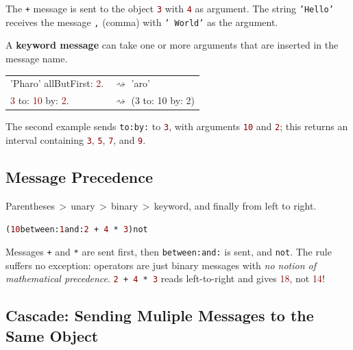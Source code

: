 \documentclass[notumble]{leaflet}
\makeatletter
\newenvironment{displaycode}{%
     \par
     \hspace{1.5em}\begin{minipage}{\linewidth}
       \begin{alltt}\small}{
       \end{alltt}
     \end{minipage}
     \par}
\newcommand{\code}[1]{\foreignlanguage{english}{\texttt{#1}}}
\makeatother
\begin{document}
The \code{+} message is sent to the object
\textcolor{darkRed}{\code{3}} with \textcolor{darkRed}{\code{4}} as
 argument. The string \textcolor{string}{\code{'Hello'}} receives the message \code{,}
(comma) with \textcolor{string}{\code{'~World'}} as the argument.

A \textbf{keyword message} can take one or more
arguments that are inserted in the message name.

\noindent
\begin{tabularx}{\linewidth}{@{}lX@{}}
        \toprule
     \textcolor{string}{'Pharo'} allButFirst: \textcolor{darkRed}{2}.& $\rightsquigarrow$ 'aro' \\
     \textcolor{darkRed}{3} to: \textcolor{darkRed}{10} by: \textcolor{darkRed}{2}.& $\rightsquigarrow$ (3 to: 10 by: 2)\\
       \midrule
\end{tabularx}

The second example sends
\code{to:by:} to \textcolor{darkRed}{\code{3}}, with arguments
\textcolor{darkRed}{\code{10}} and \textcolor{darkRed}{\code{2}}; this
returns an interval containing \textcolor{darkRed}{\code{3}},
\textcolor{darkRed}{\code{5}}, \textcolor{darkRed}{\code{7}}, and
\textcolor{darkRed}{\code{9}}.

\subsection{Message Precedence}

Parentheses\,$>$\,unary\,$>$\,binary\,$>$\,keyword, and finally from
left to right.

\begin{displaycode}
(\textcolor{darkRed}{10} between: \textcolor{darkRed}{1} and: \textcolor{darkRed}{2}\,+\,\textcolor{darkRed}{4}\,*\,\textcolor{darkRed}{3}) not
\end{displaycode}

Messages \code{+} and \code{*} are sent first, then \code{between:and:} is sent, and \code{not}.
The rule suffers no exception: operators are just binary messages with \emph{no notion of mathematical precedence}.
\code{\textcolor{darkRed}{2}\,+\,\textcolor{darkRed}{4}\,*\,\textcolor{darkRed}{3}} reads left-to-right and gives \textcolor{darkRed}{18}, not \textcolor{darkRed}{14}!


\subsection{Cascade: Sending Muliple Messages to the Same Object}
\end{document}
